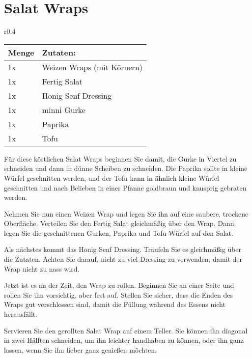 \documentclass[../../book.tex]{subfiles}
\begin{document}
\section{Salat Wraps}
\begin{wraptable}{r}{0.4\textwidth}
    \centering
    \begin{tabularx}{0.39\textwidth}{|l|X|}
        \hline
        Menge & Zutaten: \\
        \hline
        1x & Weizen Wraps (mit Körnern) \\
        \hline
        1x & Fertig Salat \\
        \hline
        1x & Honig Senf Dressing \\
        \hline
        1x & minni Gurke\\
        \hline
        1x & Paprika\\
        \hline
        1x & Tofu\\
        \hline
    \end{tabularx}
\end{wraptable}

Für diese köstlichen Salat Wraps beginnen Sie damit, die Gurke in Viertel zu schneiden und dann in dünne Scheiben zu schneiden. Die Paprika sollte in kleine Würfel geschnitten werden, und der Tofu kann in ähnlich kleine Würfel geschnitten und nach Belieben in einer Pfanne goldbraun und knusprig gebraten werden.

Nehmen Sie nun einen Weizen Wrap und legen Sie ihn auf eine saubere, trockene Oberfläche. Verteilen Sie den Fertig Salat gleichmäßig über den Wrap. Dann legen Sie die geschnittenen Gurken, Paprika und Tofu-Würfel auf den Salat.

Als nächstes kommt das Honig Senf Dressing. Träufeln Sie es gleichmäßig über die Zutaten. Achten Sie darauf, nicht zu viel Dressing zu verwenden, damit der Wrap nicht zu nass wird.

Jetzt ist es an der Zeit, den Wrap zu rollen. Beginnen Sie an einer Seite und rollen Sie ihn vorsichtig, aber fest auf. Stellen Sie sicher, dass die Enden des Wraps gut verschlossen sind, damit die Füllung während des Essens nicht herausfällt.

Servieren Sie den gerollten Salat Wrap auf einem Teller. Sie können ihn diagonal in zwei Hälften schneiden, um ihn leichter handhaben zu können, oder ihn ganz lassen, wenn Sie ihn lieber ganz genießen möchten.

\newpage
\end{document}

